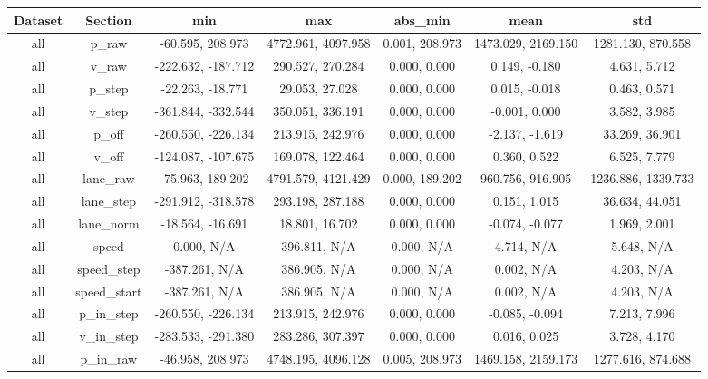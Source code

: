 \documentclass{article}
\newenvironment{changemargin}[2]{%
\begin{list}{}{%
\setlength{\topsep}{0pt}%
\setlength{\leftmargin}{#1}%
\setlength{\rightmargin}{#2}%
\setlength{\listparindent}{\parindent}%
\setlength{\itemindent}{\parindent}%
\setlength{\parsep}{\parskip}%
}%
\item[]}{\end{list}}
\begin{document}
\begin{changemargin}{-4.5cm}{-1cm}
\begin{minipage}{\linewidth}
\centering
{} \label{tab:title} 
\begin{tabular}{|c|c|c|c|c|c|c| }\toprule[1.5pt]
Dataset & Section & min & max & abs\_min & mean & std\\\hline
all & p\_raw & -60.595, 208.973 & 4772.961, 4097.958 & 0.001, 208.973 & 1473.029, 2169.150 & 1281.130, 870.558\\\hline
all & v\_raw & -222.632, -187.712 & 290.527, 270.284 & 0.000, 0.000 & 0.149, -0.180 & 4.631, 5.712\\\hline
all & p\_step & -22.263, -18.771 & 29.053, 27.028 & 0.000, 0.000 & 0.015, -0.018 & 0.463, 0.571\\\hline
all & v\_step & -361.844, -332.544 & 350.051, 336.191 & 0.000, 0.000 & -0.001, 0.000 & 3.582, 3.985\\\hline
all & p\_off & -260.550, -226.134 & 213.915, 242.976 & 0.000, 0.000 & -2.137, -1.619 & 33.269, 36.901\\\hline
all & v\_off & -124.087, -107.675 & 169.078, 122.464 & 0.000, 0.000 & 0.360, 0.522 & 6.525, 7.779\\\hline
all & lane\_raw & -75.963, 189.202 & 4791.579, 4121.429 & 0.000, 189.202 & 960.756, 916.905 & 1236.886, 1339.733\\\hline
all & lane\_step & -291.912, -318.578 & 293.198, 287.188 & 0.000, 0.000 & 0.151, 1.015 & 36.634, 44.051\\\hline
all & lane\_norm & -18.564, -16.691 & 18.801, 16.702 & 0.000, 0.000 & -0.074, -0.077 & 1.969, 2.001\\\hline
all & speed & 0.000, N/A & 396.811, N/A & 0.000, N/A & 4.714, N/A & 5.648, N/A\\\hline
all & speed\_step & -387.261, N/A & 386.905, N/A & 0.000, N/A & 0.002, N/A & 4.203, N/A\\\hline
all & speed\_start & -387.261, N/A & 386.905, N/A & 0.000, N/A & 0.002, N/A & 4.203, N/A\\\hline
all & p\_in\_step & -260.550, -226.134 & 213.915, 242.976 & 0.000, 0.000 & -0.085, -0.094 & 7.213, 7.996\\\hline
all & v\_in\_step & -283.533, -291.380 & 283.286, 307.397 & 0.000, 0.000 & 0.016, 0.025 & 3.728, 4.170\\\hline
all & p\_in\_raw & -46.958, 208.973 & 4748.195, 4096.128 & 0.005, 208.973 & 1469.158, 2159.173 & 1277.616, 874.688\\\hline

\end{tabular}
\end{minipage}
\end{changemargin}
\end{document}
